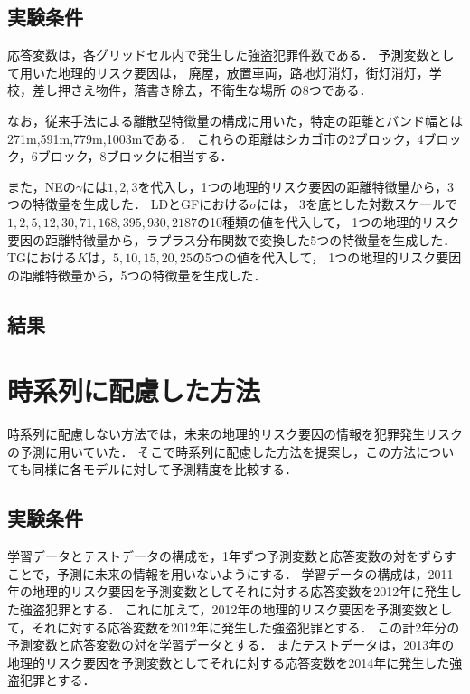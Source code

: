 \documentclass[12pt,a4paper,oneside]{jsbook}
\theoremstyle{plain}
\begin{document}
\subsection{実験条件}

応答変数は，各グリッドセル内で発生した強盗犯罪件数である．
予測変数として用いた地理的リスク要因は，
廃屋，放置車両，路地灯消灯，街灯消灯，学校，差し押さえ物件，落書き除去，不衛生な場所
の8つである．

なお，従来手法による離散型特徴量の構成に用いた，特定の距離とバンド幅とは271m,591m,779m,1003mである．
これらの距離はシカゴ市の2ブロック，4ブロック，6ブロック，8ブロックに相当する．

また，NEの$\gamma$には$1,2,3$を代入し，1つの地理的リスク要因の距離特徴量から，3つの特徴量を生成した．
LDとGFにおける$\sigma$には，
$3$を底とした対数スケールで$1,2,5,12,30,71,168,395,930,2187$の10種類の値を代入して，
1つの地理的リスク要因の距離特徴量から，ラプラス分布関数で変換した5つの特徴量を生成した．
TGにおける$K$は，$5, 10, 15, 20, 25$の5つの値を代入して，
1つの地理的リスク要因の距離特徴量から，5つの特徴量を生成した．

\subsection{結果}
\label{non-crime-no-timeseries-result}

\section{時系列に配慮した方法}
時系列に配慮しない方法では，未来の地理的リスク要因の情報を犯罪発生リスクの予測に用いていた．
そこで時系列に配慮した方法を提案し，この方法についても同様に各モデルに対して予測精度を比較する．
\subsection{実験条件}
学習データとテストデータの構成を，1年ずつ予測変数と応答変数の対をずらすことで，予測に未来の情報を用いないようにする．
学習データの構成は，2011年の地理的リスク要因を予測変数としてそれに対する応答変数を2012年に発生した強盗犯罪とする．
これに加えて，2012年の地理的リスク要因を予測変数として，それに対する応答変数を2012年に発生した強盗犯罪とする．
この計2年分の予測変数と応答変数の対を学習データとする．
またテストデータは，2013年の地理的リスク要因を予測変数としてそれに対する応答変数を2014年に発生した強盗犯罪とする．
\end{document}
